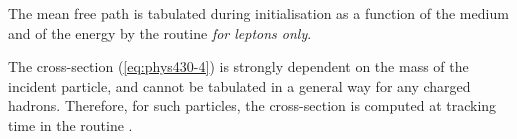 The mean free path is tabulated during initialisation 
as a function of the medium and of the energy by the routine
{\it for leptons only}.
 
The cross-section (\ref{eq:phys430-4}) is strongly dependent on the mass of 
the incident
particle, and cannot be tabulated in a general way for any charged hadrons.
Therefore, for such particles, the cross-section is computed
at tracking time in the routine .
